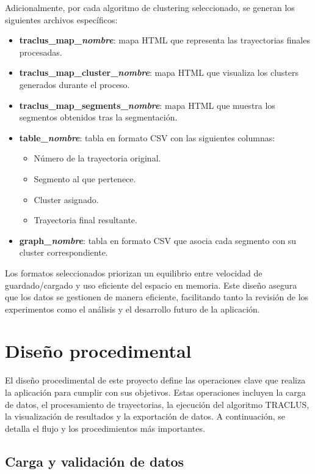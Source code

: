 Adicionalmente, por cada algoritmo de clustering seleccionado, se generan los siguientes archivos específicos:

\begin{itemize}
	\item \textbf{traclus\_map\_\textit{nombre}}: mapa HTML que representa las trayectorias finales procesadas.
	\item \textbf{traclus\_map\_cluster\_\textit{nombre}}: mapa HTML que visualiza los clusters generados durante el proceso.
	\item \textbf{traclus\_map\_segments\_\textit{nombre}}: mapa HTML que muestra los segmentos obtenidos tras la segmentación.
	\item \textbf{table\_\textit{nombre}}: tabla en formato CSV con las siguientes columnas:
	\begin{itemize}
		\item Número de la trayectoria original.
		\item Segmento al que pertenece.
		\item Cluster asignado.
		\item Trayectoria final resultante.
	\end{itemize}
	\item \textbf{graph\_\textit{nombre}}: tabla en formato CSV que asocia cada segmento con su cluster correspondiente.
\end{itemize}

Los formatos seleccionados priorizan un equilibrio entre velocidad de guardado/cargado y uso eficiente del espacio en memoria. Este diseño asegura que los datos se gestionen de manera eficiente, facilitando tanto la revisión de los experimentos como el análisis y el desarrollo futuro de la aplicación.

\section{Diseño procedimental}

El diseño procedimental de este proyecto define las operaciones clave que realiza la aplicación para cumplir con sus objetivos. Estas operaciones incluyen la carga de datos, el procesamiento de trayectorias, la ejecución del algoritmo TRACLUS, la visualización de resultados y la exportación de datos. A continuación, se detalla el flujo y los procedimientos más importantes.

\subsection{Carga y validación de datos}

